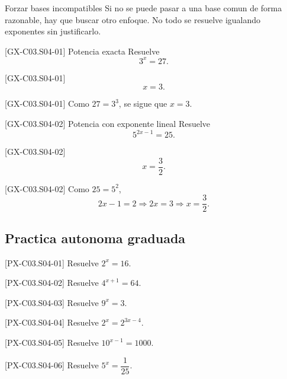 \begin{commonerror}{Forzar bases incompatibles}
Si no se puede pasar a una base comun de forma razonable, hay que buscar otro enfoque. No todo
se resuelve igualando exponentes sin justificarlo.
\end{commonerror}

\begin{guidedexercise}{[GX-C03.S04-01] Potencia exacta}
Resuelve
\[
3^x=27.
\]
\end{guidedexercise}

\begin{shortanswer}{[GX-C03.S04-01]}
\[
x=3.
\]
\end{shortanswer}

\begin{fullsolution}{[GX-C03.S04-01]}
Como \(27=3^3\), se sigue que \(x=3\).
\end{fullsolution}

\begin{guidedexercise}{[GX-C03.S04-02] Potencia con exponente lineal}
Resuelve
\[
5^{2x-1}=25.
\]
\end{guidedexercise}

\begin{shortanswer}{[GX-C03.S04-02]}
\[
x=\frac{3}{2}.
\]
\end{shortanswer}

\begin{fullsolution}{[GX-C03.S04-02]}
Como \(25=5^2\),
\[
2x-1=2 \Longrightarrow 2x=3 \Longrightarrow x=\frac{3}{2}.
\]
\end{fullsolution}

\subsection*{Practica autonoma graduada}
\begin{exercise}{[PX-C03.S04-01] Resuelve \(2^x=16\).}
\end{exercise}
\begin{exercise}{[PX-C03.S04-02] Resuelve \(4^{x+1}=64\).}
\end{exercise}
\begin{exercise}{[PX-C03.S04-03] Resuelve \(9^x=3\).}
\end{exercise}
\begin{exercise}{[PX-C03.S04-04] Resuelve \(2^x=2^{3x-4}\).}
\end{exercise}
\begin{exercise}{[PX-C03.S04-05] Resuelve \(10^{x-1}=1000\).}
\end{exercise}
\begin{exercise}{[PX-C03.S04-06] Resuelve \(5^x=\dfrac{1}{25}\).}
\end{exercise}

